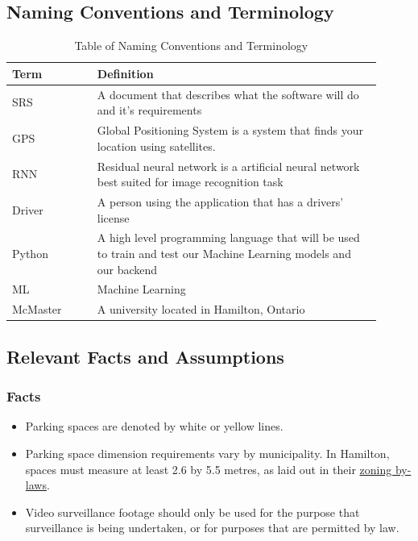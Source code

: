 \documentclass[12pt,letterpaper]{article}
\newcommand{\newterm}[1]{\label{Term:#1} \MakeUppercase #1}
\begin{document}
\newpage
\subsection{Naming Conventions and Terminology}
\label{sub:Naming Conventions and Terminology}
\begin{table}[h!]
    \centering
    \caption{Table of Naming Conventions and Terminology}
    \label{tab:Definitions}
    \begin{tabular}{p{0.21\linewidth}  p{0.70\linewidth}}
    \toprule
    \textbf{Term} & \textbf{Definition}\\
    \midrule
    \newterm{SRS} & A document that describes what the software will do and it's
    requirements\\
    \hline
    \newterm{GPS} & Global Positioning System is a system that finds your
    location using satellites.\\
    \hline
    \newterm{RNN} & Residual neural network is a artificial neural network best
    suited for image recognition task \\
    \hline
    \newterm{Driver} & A person using the application that has a drivers'
    license\\
    \hline
    \newterm{Python} & A high level programming language that will be used to
    train and test our Machine Learning models and our backend\\
    \hline
    \newterm{ML} & Machine Learning\\
    \hline
    \newterm{McMaster} & A university located in Hamilton, Ontario\\
    \bottomrule
    \end{tabular}
\end{table}

\subsection{Relevant Facts and Assumptions}
\subsubsection{Facts}
\begin{itemize}
    \item Parking spaces are denoted by white or yellow lines.
    \item Parking space dimension requirements vary by municipality. In
    Hamilton, spaces must measure at least 2.6 by 5.5 metres, as laid out in
    their
    \href{http://www2.hamilton.ca/NR/rdonlyres/D4866111-3F89-42C3-9594-1E7E7F3028AD/0/ZBL05200Section5Parking.pdf}{zoning
    by-laws}.
    \item Video surveillance footage should only be used for the purpose that
    surveillance is being undertaken, or for purposes that are permitted by law.
\end{itemize}
\end{document}
